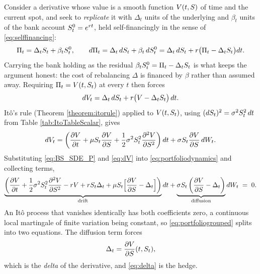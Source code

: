 Consider a derivative whose value is a smooth function $V(t,S)$ of time and the current spot, and
seek to \emph{replicate} it with $\Delta_t$ units of the underlying and $\beta_t$ units of the bank
account $S^{0}_t = e^{r t}$, held self-financingly in the sense of \eqref{eq:selffinancing}:
\[
\Pi_t = \Delta_t S_t + \beta_t S^{0}_t,
\qquad
d\Pi_t = \Delta_t\,dS_t + \beta_t\,dS^{0}_t = \Delta_t\,dS_t + r\bigl(\Pi_t - \Delta_tS_t\bigr)dt .
\]
Carrying the bank holding as the residual $\beta_tS^{0}_t = \Pi_t - \Delta_tS_t$ is what keeps the
argument honest: the cost of rebalancing $\Delta$ is financed by $\beta$ rather than assumed away.
Requiring $\Pi_t = V(t,S_t)$ at every $t$ then forces
\begin{equation}\label{eq:portfoliodynamics}
    dV_t = \Delta_t \, dS_t + r\bigl(V - \Delta_t S_t\bigr)\,dt .
\end{equation}
Itô's rule (Theorem \ref{theorem:itorule}) applied to $V(t,S_t)$, using 
$(dS_t)^2 = \sigma^2S_t^2\,dt$ from Table \ref{tab:ItoTableScalar}, gives
\begin{equation}\label{eq:dV}
    dV_t = \left( \frac{\partial V}{\partial t} + \mu S_t\frac{\partial V}{\partial S} 
    + \frac{1}{2} \sigma^2 S_t^2 \frac{\partial^2 V}{\partial S^2} \right) dt 
    + \sigma S_t \frac{\partial V}{\partial S}\, dW_t .
\end{equation}
Substituting \eqref{eq:BS_SDE_P} and \eqref{eq:dV} into \eqref{eq:portfoliodynamics} and collecting
terms,
\begin{equation}\label{eq:portfoliogrouped}
    \underbrace{\left( \frac{\partial V}{\partial t}
    + \frac{1}{2}\sigma^2 S_t^2 \frac{\partial^2 V}{\partial S^2} - r V + rS_t\Delta_t
    + \mu S_t\Bigl[\frac{\partial V}{\partial S} - \Delta_t\Bigr] \right)}_{\text{drift}} dt
    + \underbrace{\sigma S_t\left( \frac{\partial V}{\partial S} - \Delta_t \right)}_{\text{diffusion}} dW_t \;=\; 0 .
\end{equation}
An Itô process that vanishes identically has both coefficients zero, a continuous local martingale of
finite variation being constant, so \eqref{eq:portfoliogrouped} splits into two equations. The
diffusion term forces
\begin{equation}\label{eq:delta}
    \Delta_t = \frac{\partial V}{\partial S}(t,S_t) ,
\end{equation}
which is the \emph{delta} of the derivative, and \eqref{eq:delta} is the hedge.

